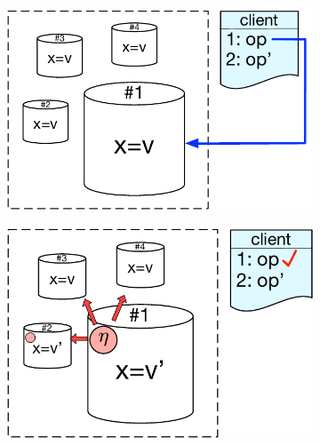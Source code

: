 \begin{figure}[t]
    \centering
    \begin{subfigure}[t]{0.3\textwidth}
    \centering
        \includegraphics[scale=0.32]{Figures/system_model1.pdf}
        \label{fig:sys_model1}
    \end{subfigure}
    \hfill
    \vline
    \hfill
    \begin{subfigure}[t]{0.3\textwidth}
        \centering
	\includegraphics[scale=0.32]{Figures/system_model2.pdf}
        \label{fig:sys_model2}
    \end{subfigure}
    \hfill
    \vline
    \hfill
    \begin{subfigure}[t]{0.3\textwidth}

\end{subfigure}
\end{figure}
